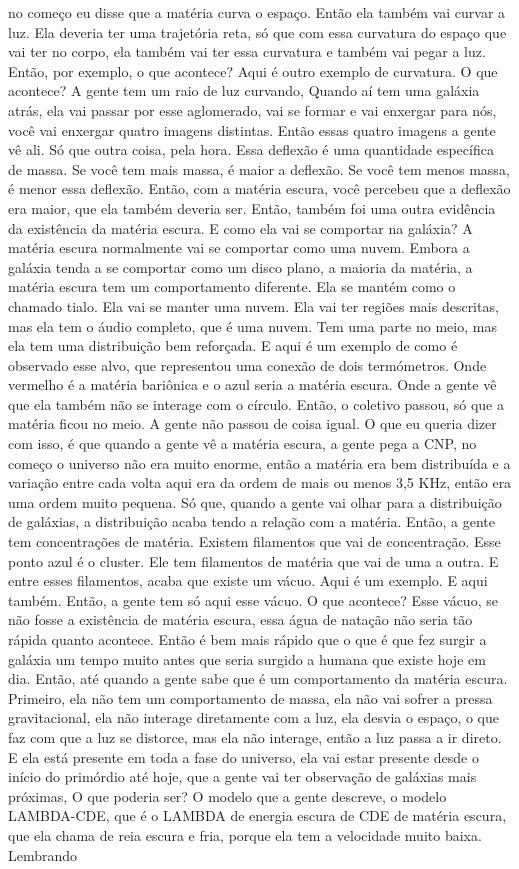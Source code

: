 \documentclass[
	article,			%
	11pt,				%
	twoside,			%
	a4paper,			%
	english,			%
	brazil,				%
	sumario=tradicional
	]{abntex2}
\begin{document}
no começo eu disse que a matéria curva o espaço. Então ela também vai curvar a luz. Ela deveria ter uma trajetória reta, só que com essa curvatura do espaço que vai ter no corpo, ela também vai ter essa curvatura e também vai pegar a luz. Então, por exemplo, o que acontece? Aqui é outro exemplo de curvatura. O que acontece? A gente tem um raio de luz curvando, Quando aí tem uma galáxia atrás, ela vai passar por esse aglomerado, vai se formar e vai enxergar para nós, você vai enxergar quatro imagens distintas. Então essas quatro imagens a gente vê ali. Só que outra coisa, pela hora. Essa deflexão é uma quantidade específica de massa. Se você tem mais massa, é maior a deflexão. Se você tem menos massa, é menor essa deflexão. Então, com a matéria escura, você percebeu que a deflexão era maior, que ela também deveria ser. Então, também foi uma outra evidência da existência da matéria escura. E como ela vai se comportar na galáxia? A matéria escura normalmente vai se comportar como uma nuvem. Embora a galáxia tenda a se comportar como um disco plano, a maioria da matéria, a matéria escura tem um comportamento diferente. Ela se mantém como o chamado tialo. Ela vai se manter uma nuvem. Ela vai ter regiões mais descritas, mas ela tem o áudio completo, que é uma nuvem. Tem uma parte no meio, mas ela tem uma distribuição bem reforçada. E aqui é um exemplo de como é observado esse alvo, que representou uma conexão de dois termómetros. Onde vermelho é a matéria bariônica e o azul seria a matéria escura. Onde a gente vê que ela também não se interage com o círculo. Então, o coletivo passou, só que a matéria ficou no meio. A gente não passou de coisa igual. O que eu queria dizer com isso, é que quando a gente vê a matéria escura, a gente pega a CNP, no começo o universo não era muito enorme, então a matéria era bem distribuída e a variação entre cada volta aqui era da ordem de mais ou menos 3,5 KHz, então era uma ordem muito pequena. Só que, quando a gente vai olhar para a distribuição de galáxias, a distribuição acaba tendo a relação com a matéria. Então, a gente tem concentrações de matéria. Existem filamentos que vai de concentração. Esse ponto azul é o cluster. Ele tem filamentos de matéria que vai de uma a outra. E entre esses filamentos, acaba que existe um vácuo. Aqui é um exemplo. E aqui também. Então, a gente tem só aqui esse vácuo. O que acontece? Esse vácuo, se não fosse a existência de matéria escura, essa água de natação não seria tão rápida quanto acontece. Então é bem mais rápido que o que é que fez surgir a galáxia um tempo muito antes que seria surgido a humana que existe hoje em dia. Então, até quando a gente sabe que é um comportamento da matéria escura. Primeiro, ela não tem um comportamento de massa, ela não vai sofrer a pressa gravitacional, ela não interage diretamente com a luz, ela desvia o espaço, o que faz com que a luz se distorce, mas ela não interage, então a luz passa a ir direto. E ela está presente em toda a fase do universo, ela vai estar presente desde o início do primórdio até hoje, que a gente vai ter observação de galáxias mais próximas, O que poderia ser? O modelo que a gente descreve, o modelo LAMBDA-CDE, que é o LAMBDA de energia escura de CDE de matéria escura, que ela chama de reia escura e fria, porque ela tem a velocidade muito baixa. Lembrando 
\end{document}
